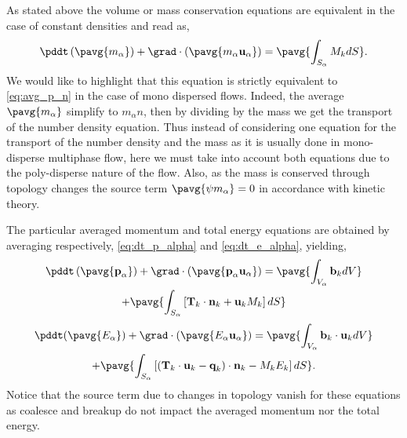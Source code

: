 As stated above the volume or mass conservation equations are equivalent in the case of constant densities and read as, 
\begin{equation}
    \pddt   \left(\pavg{m_\alpha}\right)
    + \grad \cdot \left(\pavg{m_\alpha \textbf{u}_\alpha}\right) 
    = 
    \pavg{\int_{S_\alpha} M_k d S}. 
    \label{eq:avg_p_m_mass}
\end{equation}
We would like to highlight that this equation is strictly equivalent to \ref{eq:avg_p_n} in the case of mono dispersed flows. 
Indeed, the average $\pavg{m_\alpha}$ simplify to $m_\alpha n$, then by dividing by the mass we get the transport of the number density equation. 
Thus instead of considering one equation for the transport of the number density and the mass as it is usually done in mono-disperse multiphase flow, here we must take into account both equations due to the poly-disperse nature of the flow. 
Also, as the mass is conserved through topology changes the source term $\pavg{\psi m_\alpha} = 0$ in accordance with kinetic theory.

The particular averaged momentum and total energy equations are obtained by averaging respectively, \ref{eq:dt_p_alpha} and \ref{eq:dt_e_alpha}, yielding, 
\begin{multline}
    \pddt   \left(\pavg{\textbf{p}_\alpha}\right)
    + \grad \cdot (\pavg{\textbf{p}_\alpha \textbf{u}_\alpha})
    = \pavg{\int_{V_\alpha} \textbf{b}_k dV}\\
    + \pavg{\int_{S_\alpha} \left[\textbf{T}_k  \cdot \textbf{n}_k  + \textbf{u}_k M_k \right]d S}
    \label{eq:avg_p_momentum}
\end{multline}
\begin{multline}
    \pddt (\pavg{E_\alpha})
    + \grad \cdot ( \pavg{E_\alpha \textbf{u}_\alpha})
    = \pavg{\int_{V_\alpha} \textbf{b}_k \cdot \textbf{u}_k dV}\\
    + \pavg{\int_{S_\alpha} \left[
        (\textbf{T}_k\cdot \textbf{u}_k 
    - \textbf{q}_k)\cdot\textbf{n}_k 
    - M_k E_k 
    \right]dS}.
    \label{eq:avg_p_energy}
\end{multline}
Notice that the source term due to changes in topology vanish for these equations as coalesce and breakup do not impact the averaged momentum nor the total energy.  
